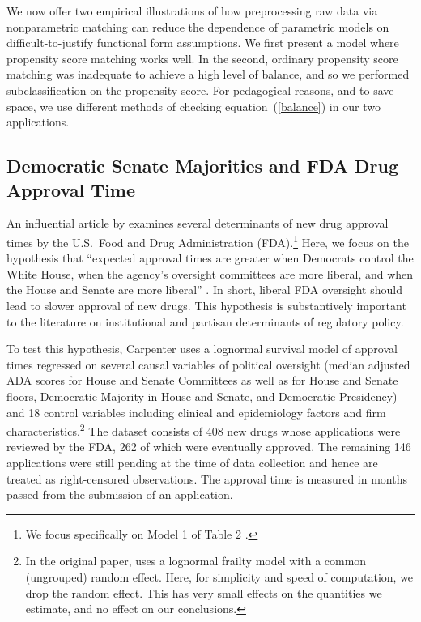 \documentclass[11pt,titlepage]{article}
\begin{document}
We now offer two empirical illustrations of how preprocessing raw data
via nonparametric matching can reduce the dependence of parametric
models on difficult-to-justify functional form assumptions.  We first
present a model where propensity score matching works well.  In the
second, ordinary propensity score matching was inadequate to achieve a
high level of balance, and so we performed subclassification on the
propensity score. For pedagogical reasons, and to save space, we use
different methods of checking equation~(\ref{balance}) in our two
applications.

\subsection{Democratic Senate Majorities and FDA Drug Approval Time}

An influential article by \citet{Carp02} examines several determinants
of new drug approval times by the U.S.\ Food and Drug Administration
(FDA).\footnote{We focus specifically on Model 1 of Table 2 \citep[p.
  499]{Carp02}.}  Here, we focus on the hypothesis that ``expected
approval times are greater when Democrats control the White House,
when the agency's oversight committees are more liberal, and when the
House and Senate are more liberal'' \citep[p.495]{Carp02}.  In short,
liberal FDA oversight should lead to slower approval of new drugs.
This hypothesis is substantively important to the literature on
institutional and partisan determinants of regulatory policy.

To test this hypothesis, Carpenter uses a lognormal survival model of
approval times regressed on several causal variables of political
oversight (median adjusted ADA scores for House and Senate Committees
as well as for House and Senate floors, Democratic Majority in House
and Senate, and Democratic Presidency) and 18 control variables
including clinical and epidemiology factors and firm
characteristics.\footnote{In the original paper, \citet{Carp02} uses a
  lognormal frailty model with a common (ungrouped) random effect.
  Here, for simplicity and speed of computation, we drop the random
  effect.  This has very small effects on the quantities we estimate,
  and no effect on our conclusions.}  The dataset consists of 408 new
drugs whose applications were reviewed by the FDA, 262 of which were
eventually approved.  The remaining 146 applications were still
pending at the time of data collection and hence are treated as
right-censored observations. The approval time is measured in months
passed from the submission of an application.
\end{document}
